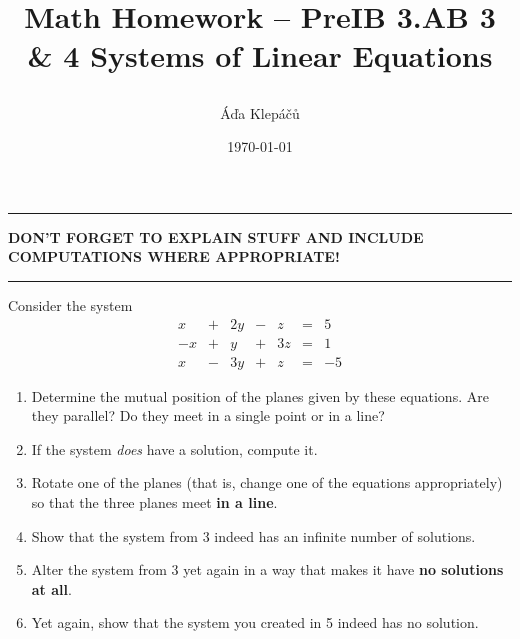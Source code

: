 \documentclass[a4paper,11pt]{article}
\title{\Huge\textsf{Math Homework -- PreIB 3.AB 3 \& 4}
 \Large\textsf{Systems of Linear Equations}
 \author{Áďa Klepáčů}
 \date{\today}
}
\newcommand{\clr}{\textcolor{BrickRed}}
\begin{document}
\maketitle
\thispagestyle{fancy}

\begin{center}
 \hrule
 \textbf{\clr{DON'T FORGET TO EXPLAIN STUFF AND INCLUDE COMPUTATIONS WHERE
 APPROPRIATE!}}
 \vspace{2ex}
 \hrule
\end{center}

Consider the system
\[
 \begin{array}{rrrrrrr}
  x & + & 2y & - & z & = & 5\\
  -x & + & y & + & 3z & = & 1\\
  x & - & 3y & + & z & = & -5
 \end{array}
\]
\begin{enumerate}
 \item Determine the mutual position of the planes given by these equations. Are
  they parallel? Do they meet in a single point or in a line?
 \item If the system \emph{does} have a solution, compute it.
 \item Rotate one of the planes (that is, change one of the equations
  appropriately) so that the three planes meet \textbf{in a line}.
 \item Show that the system from 3 indeed has an infinite number of solutions.
 \item Alter the system from 3 yet again in a way that makes it have \textbf{no
  solutions at all}.
 \item Yet again, show that the system you created in 5 indeed has no solution.
\end{enumerate}
\end{document}
